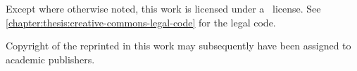 
\begin{center}
    \begin{minipage}[c][\textheight-3.5em][b]{\textwidth-10em-2em}
        Except where otherwise noted, this work is licensed under a \doclicenseLongNameRef~license. 
        See \cref{chapter:thesis:creative-commons-legal-code} for the legal code.
    \end{minipage}
    \hfill
    \begin{minipage}[c][\textheight-3.5em][b]{10em}
        \doclicenseImage
    \end{minipage}
    
    \begin{minipage}[c][3em][b]{\textwidth}
        Copyright of the  reprinted in 
        this work may subsequently have been assigned to academic publishers.
    \end{minipage}
\end{center}
